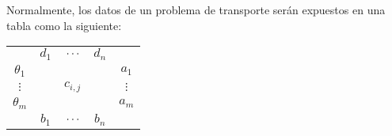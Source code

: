 \documentclass[11pt]{report}
\theoremstyle{mytheorem}
\theoremstyle{mydefinition}
\theoremstyle{myexample}
\begin{document}
Normalmente, los datos de un problema de transporte serán expuestos en una tabla como la siguiente:
\begin{center}
\setlength\extrarowheight{1.5pt}
\begin{tabular}{ccccc}

     \multicolumn{1}{c}{} & \multicolumn{1}{c}{$d_1$} & \multicolumn{1}{c}{$\mathellipsis$} & \multicolumn{1}{c}{$d_n$} & \multicolumn{1}{c}{} \\[1.5pt] \cline{2-4}

    \multicolumn{1}{c|}{$\theta_1$} & \multicolumn{1}{c}{} & \multicolumn{1}{c}{} & \multicolumn{1}{c|}{} & \multicolumn{1}{c}{$a_1$} \\

    \multicolumn{1}{c|}{$\vdots$} & \multicolumn{1}{c}{} & \multicolumn{1}{c}{$c_{i,j}$} & \multicolumn{1}{c|}{} & \multicolumn{1}{c}{$\vdots$} \\

    \multicolumn{1}{c|}{$\theta_m$} & \multicolumn{1}{c}{} & \multicolumn{1}{c}{} & \multicolumn{1}{c|}{} & \multicolumn{1}{c}{$a_m$} \\[4pt] \cline{2-4}

     \multicolumn{1}{c}{} & \multicolumn{1}{c}{$b_1$} & \multicolumn{1}{c}{$\mathellipsis$} & \multicolumn{1}{c}{$b_n$} & \multicolumn{1}{c}{} \\
\end{tabular}
\end{center}
\end{document}
